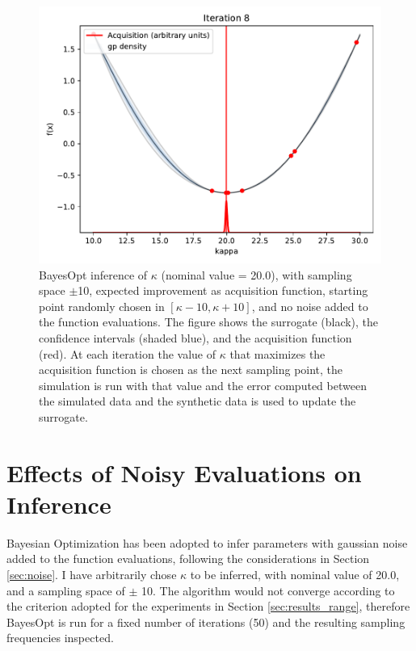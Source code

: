 \documentclass[bsc,frontabs,singlespacing,parskip,deptreport]{infthesis}
\begin{document}
\begin{figure}[ht]
    \includegraphics[width=.25\textwidth]{Images/Range/convergence_iter_8.pdf}
    \caption{BayesOpt inference of $\kappa$ (nominal value = 20.0), with sampling space $\pm$10, expected improvement as acquisition function, starting point randomly chosen in $[\kappa-10, \kappa+10]$, and no noise added to the function evaluations. The figure shows the surrogate (black), the confidence intervals (shaded blue), and the acquisition function (red). At each iteration the value of $\kappa$ that maximizes the acquisition function is chosen as the next sampling point, the simulation is run with that value and the error computed between the simulated data and the synthetic data is used to update the surrogate.}
    \label{fig:progression}
\end{figure}




\section{Effects of Noisy Evaluations on Inference}\label{sec:results_noise}
Bayesian Optimization has been adopted to infer parameters with gaussian noise added to the function evaluations, following the considerations in Section \ref{sec:noise}. I have arbitrarily chose $\kappa$ to be inferred, with nominal value of 20.0, and a sampling space of $\pm$ 10. The algorithm would not converge according to the criterion adopted for the experiments in Section \ref{sec:results_range}, therefore BayesOpt is run for a fixed number of iterations (50) and the resulting sampling frequencies inspected.
\end{document}
